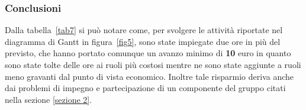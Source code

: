 \subsubsection{Conclusioni}
Dalla tabella~\ref{tab7} si può notare come, per svolgere le attività riportate nel diagramma di \gls{Gantt} in figura~\ref{fig5}, sono state impiegate due ore in più del previsto, che hanno portato comunque un avanzo minimo di \textbf{10} euro in quanto sono state tolte delle ore ai ruoli più costosi mentre ne sono state aggiunte a ruoli meno gravanti dal punto di vista economico. Inoltre tale risparmio deriva anche dai problemi di impegno e partecipazione di un componente del gruppo citati nella sezione \ref{sezione 2}.

\newpage